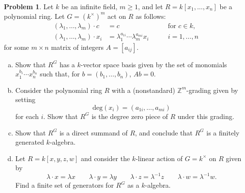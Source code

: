 \documentclass[11pt]{article}
\theoremstyle{definition}
\newtheorem{problem}{Problem}
\begin{document}
\begin{problem}
Let $k$ be an infinite field, $m \geqslant 1$, and let $R = k[x_1,\dots, x_n]$ be a polynomial ring. Let $G= (k^\times)^m$ act on $R$ as follows: 
\[ \begin{aligned} (\lambda_1,\dots,\lambda_m) \cdot c &= c \qquad & \textrm{for }c \in k,\\
 (\lambda_1,\dots,\lambda_m) \cdot x_i &= \lambda_1^{a_{1i}} \cdots  \lambda_m^{a_{mi}} x_i \qquad & {i=1,\dots,n}
 \end{aligned}\]
 for some $m \times n$ matrix of integers $A=[a_{ij}]$.
\begin{enumerate}[a)]
\item Show that $R^G$ has a $k$-vector space basis given by the set of monomials $x_1^{b_1} \cdots x_n^{b_n}$ such that, for $b=(b_1,\dots,b_n)$, $Ab=0$.
\item Consider the polynomial ring $R$ with a (nonstandard) $\mathbb{Z}^m$-grading given by setting 
$$\textrm{deg}(x_i) = (a_{1i},\dots,a_{mi})$$ 
for each $i$. Show that $R^G$ is the degree zero piece of $R$ under this grading.
\item Show that $R^G$ is a direct summand of $R$, and conclude that $R^G$ is a finitely generated $k$-algebra.
\item Let $R = k[x,y,z,w]$ and consider the $k$-linear action of $G = k^\times$ on $R$ given by
$$\lambda \cdot x = \lambda x \qquad \lambda \cdot y = \lambda y \qquad \lambda \cdot z = \lambda^{-1} z \qquad \lambda \cdot w = \lambda^{-1} w.$$
Find a finite set of generators for $R^G$ as a $k$-algebra.
\end{enumerate}
\end{problem}
\end{document}
